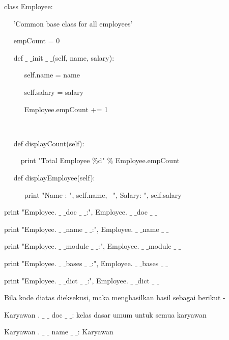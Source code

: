 \documentclass[a4paper,12pt]{report}
\begin{document}
class Employee: \par
\noindent 
~~ 'Common base class for all employees' \par
\noindent 
~~ empCount = 0 \par
\vspace{12pt}
\noindent 
~~ def  $  \_  $ $  \_  $init $  \_  $ $  \_  $(self, name, salary): \par
\noindent 
~~~~~ self.name = name \par
\noindent 
~~~~~ self.salary = salary \par
\noindent 
~~~~~ Employee.empCount += 1 \par
\noindent 
~~  \par
\noindent 
~~ def displayCount(self): \par
\noindent 
~~~~ print "Total Employee  $  \%  $d"  $  \%  $ Employee.empCount \par
\vspace{12pt}
\noindent 
~~ def displayEmployee(self): \par
\noindent 
~~~~~ print "Name : ", self.name,~ ", Salary: ", self.salary \par
\vspace{12pt}
\noindent 
print "Employee. $  \_  $ $  \_  $doc $  \_  $ $  \_  $:", Employee. $  \_  $ $  \_  $doc $  \_  $ $  \_  $ \par
\noindent 
print "Employee. $  \_  $ $  \_  $name $  \_  $ $  \_  $:", Employee. $  \_  $ $  \_  $name $  \_  $ $  \_  $ \par
\noindent 
print "Employee. $  \_  $ $  \_  $module $  \_  $ $  \_  $:", Employee. $  \_  $ $  \_  $module $  \_  $ $  \_  $ \par
\noindent 
print "Employee. $  \_  $ $  \_  $bases $  \_  $ $  \_  $:", Employee. $  \_  $ $  \_  $bases $  \_  $ $  \_  $ \par
\noindent 
print "Employee. $  \_  $ $  \_  $dict $  \_  $ $  \_  $:", Employee. $  \_  $ $  \_  $dict $  \_  $ $  \_  $ \par
\vspace{12pt}
\vspace{16pt}
\noindent 
Bila kode diatas dieksekusi, maka menghasilkan hasil sebagai berikut - \par
\vspace{12pt}
\noindent 
Karyawan . $  \_  $ $  \_  $ doc $  \_  $ $  \_  $: kelas dasar umum untuk semua karyawan \par
\noindent 
Karyawan . $  \_  $ $  \_  $ name $  \_  $ $  \_  $: Karyawan \par
\end{document}
